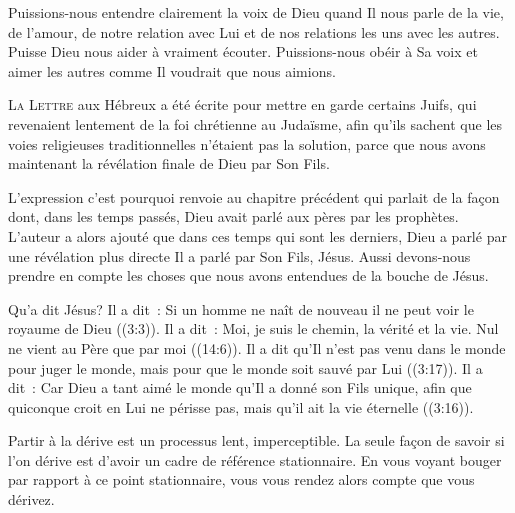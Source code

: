Puissions-nous entendre clairement la voix de Dieu quand Il nous parle
 de la vie, de l'amour, de notre relation avec Lui et de nos relations
 les uns avec les autres. Puisse Dieu nous aider à vraiment écouter.
 Puissions-nous obéir à Sa voix et aimer les autres comme Il voudrait
 que nous aimions.

\dvrule






\lettrine{L}{a Lettre} aux Hébreux a été écrite pour mettre en garde
 certains Juifs, qui revenaient lentement de la foi chrétienne au Judaïsme,
 afin qu'ils sachent que les voies religieuses traditionnelles
 n'étaient pas la solution, parce que nous avons maintenant
 la révélation finale de Dieu par Son Fils. 

L'expression \og c'est pourquoi \fg{} renvoie au chapitre précédent
 qui parlait de la façon dont, dans les temps passés,
 Dieu avait parlé aux pères par les prophètes.
 L'auteur a alors ajouté que dans ces temps qui sont les derniers,
 Dieu a parlé par une révélation plus directe
 \ocadr Il a parlé par Son Fils, Jésus.
 Aussi devons-nous prendre en compte les choses que nous avons entendues
 de la bouche de Jésus. 


Qu'a dit Jésus? Il a dit~: 
 \og Si un homme ne naît de nouveau il ne peut voir le royaume de Dieu \fg{}
 ((3:3)).
 Il a dit~: 
 \og Moi, je suis le chemin, la vérité et la vie.
 Nul ne vient au Père que par moi \fg{} ((14:6)).
 Il a dit qu'Il n'est pas venu \og dans le monde pour juger le monde,
 mais pour que le monde soit sauvé par Lui \fg{} ((3:17)).
 Il a dit~: 
 \og Car Dieu a tant aimé le monde qu'Il a donné son Fils unique,
 afin que quiconque croit en Lui ne périsse pas,
 mais qu'il ait la vie éternelle \fg{} ((3:16)). 

Partir à la dérive est un processus lent, imperceptible.
 La seule façon de savoir si l'on dérive est d'avoir un cadre de référence
 stationnaire.
 En vous voyant bouger par rapport à ce point stationnaire,
 vous vous rendez alors compte que vous dérivez. 

